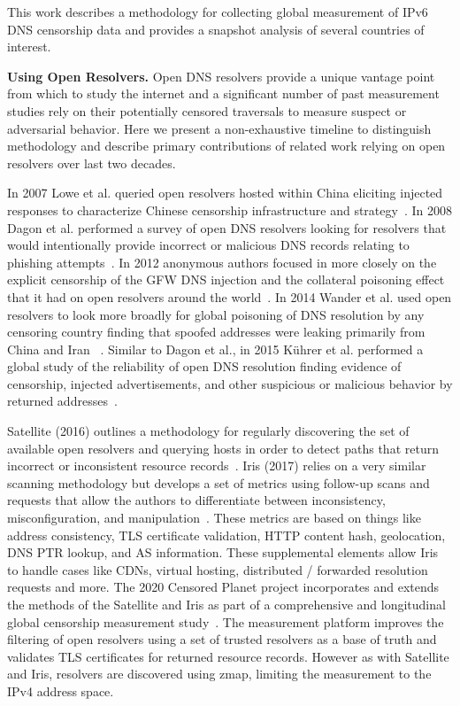 

This work describes a methodology for collecting global measurement of IPv6 DNS
censorship data and provides a snapshot analysis of several countries of interest.

\textbf{Using Open Resolvers.}
Open DNS resolvers provide a unique vantage point from which to study the internet
and a significant number of past measurement studies rely on their potentially censored
traversals to measure suspect or adversarial behavior.  Here we present a
non-exhaustive timeline to distinguish methodology and describe primary
contributions of related work relying on open resolvers over last two decades.

In 2007 Lowe et al. queried open resolvers hosted within China
eliciting injected responses to characterize Chinese censorship infrastructure
and strategy~\cite{lowe2007great}. In 2008 Dagon et al.
performed a survey of open DNS resolvers looking for resolvers that would
intentionally provide incorrect or malicious DNS records relating to
phishing attempts~\cite{dagon2008corrupted}.
In 2012 anonymous authors focused in more closely on the explicit censorship of
the GFW DNS injection and the collateral poisoning effect that it had on open
resolvers around the world~\cite{levis2012collateral}. In 2014 Wander et al.
used open resolvers to look more broadly for global poisoning of DNS resolution
by any censoring country finding that spoofed addresses were leaking primarily
from China and Iran ~\cite{wander2014measurement}. Similar to Dagon et al., in 2015
K{\"u}hrer et al. performed a global study of the reliability of open DNS resolution
finding evidence of censorship, injected advertisements, and other suspicious
or malicious behavior by returned addresses~\cite{kuhrer2015going}.

Satellite (2016) outlines a methodology for regularly discovering the set of
available open resolvers and querying hosts in order to detect paths
that return incorrect or inconsistent resource records~\cite{scott2016satellite}.
Iris (2017) relies on a very similar scanning methodology but develops a set of
metrics using follow-up scans and requests that allow the authors to differentiate
between inconsistency, misconfiguration, and manipulation~\cite{pearce2017global}.
These metrics are based
on things like address consistency, TLS certificate validation, HTTP content hash,
geolocation, DNS PTR lookup, and AS information. These supplemental elements
allow Iris to handle cases like CDNs, virtual hosting, distributed / forwarded
resolution requests and more. The 2020 Censored Planet project incorporates
and extends the methods of the Satellite and Iris as part of a comprehensive
and longitudinal global censorship measurement study~\cite{sundara2020censored}.
The measurement platform improves the filtering of open resolvers using a set of
trusted resolvers as a base of truth and validates TLS certificates for returned
resource records. However as with Satellite and Iris, resolvers are discovered
using zmap, limiting the measurement to the IPv4 address space.


